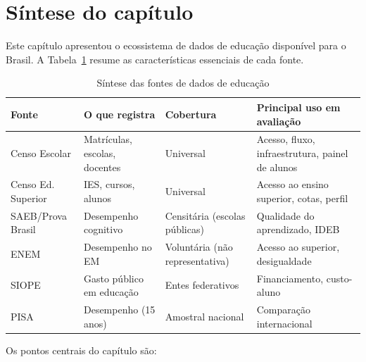 \section{Síntese do capítulo}

Este capítulo apresentou o ecossistema de dados de educação disponível para o Brasil. A Tabela~\ref{tab:sintese_cap6} resume as características essenciais de cada fonte.

\begin{table}[H]
\centering
\caption{Síntese das fontes de dados de educação}
\label{tab:sintese_cap6}
\small
\begin{tabularx}{\textwidth}{@{} p{2.5cm} p{3cm} >{\raggedright\arraybackslash}p{2.5cm} X @{}}
\toprule
\textbf{Fonte} & \textbf{O que registra} & \textbf{Cobertura} & \textbf{Principal uso em avaliação} \\
\midrule
Censo Escolar      & Matrículas, escolas, docentes & Universal & Acesso, fluxo, infraestrutura, painel de alunos \\
Censo Ed. Superior & IES, cursos, alunos           & Universal & Acesso ao ensino superior, cotas, perfil \\
SAEB/Prova Brasil  & Desempenho cognitivo          & Censitária (escolas públicas) & Qualidade do aprendizado, IDEB \\
ENEM               & Desempenho no EM              & Voluntária (não representativa) & Acesso ao superior, desigualdade \\
SIOPE              & Gasto público em educação     & Entes federativos & Financiamento, custo-aluno \\
PISA               & Desempenho (15 anos)          & Amostral nacional & Comparação internacional \\
\bottomrule
\end{tabularx}
\end{table}

Os pontos centrais do capítulo são:


